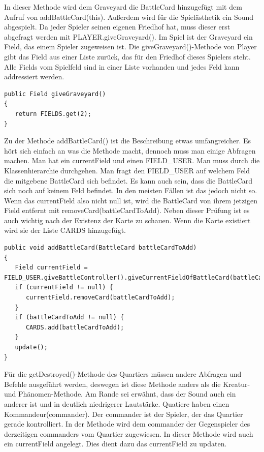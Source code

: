 In dieser Methode wird dem Graveyard die BattleCard hinzugefügt mit dem Aufruf von addBattleCard(this). Außerdem wird für die Spielästhetik ein Sound abgespielt.
Da jeder Spieler seinen eigenen Friedhof hat, muss dieser erst abgefragt werden mit PLAYER.giveGraveyard(). Im Spiel ist der Graveyard ein Field, das einem Spieler zugeweisen ist. Die giveGraveyard()-Methode von Player gibt das Field aus einer Liste zurück, das für den Friedhof dieses Spielers steht. Alle Fields vom Spielfeld sind in einer Liste vorhanden und jedes Feld kann addressiert werden.
\begin{lstlisting}
public Field giveGraveyard()
{
   return FIELDS.get(2);
}
\end{lstlisting}
Zu der Methode addBattleCard() ist die Beschreibung etwas umfangreicher. Es hört sich einfach an was die Methode macht, dennoch muss man einige Abfragen machen.
Man hat ein currentField und einen FIELD\_USER. Man muss durch die Klassenhierarchie durchgehen. Man fragt den FIELD\_USER auf welchem Feld die mitgebene BattleCard sich befindet. Es kann auch sein, dass die BattleCard sich noch auf keinem Feld befindet. In den meisten Fällen ist das jedoch nicht so. Wenn das currentField also nicht null ist, wird die BattleCard von ihrem jetzigen Field entfernt mit removeCard(battleCardToAdd). Neben dieser Prüfung ist es auch wichtig nach der Existenz der Karte zu schauen. Wenn die Karte existiert wird sie der Liste CARDS hinzugefügt.

\begin{lstlisting}[basicstyle=\tiny]
public void addBattleCard(BattleCard battleCardToAdd)
{
   Field currentField = FIELD_USER.giveBattleController().giveCurrentFieldOfBattleCard(battleCardToAdd);
   if (currentField != null) {
      currentField.removeCard(battleCardToAdd);
   }
   if (battleCardToAdd != null) {
      CARDS.add(battleCardToAdd);
   }
   update();
}
\end{lstlisting}
Für die getDestroyed()-Methode des Quartiers müssen andere Abfragen und Befehle ausgeführt werden, deswegen ist diese Methode anders als die Kreatur- und Phänomen-Methode. Am Rande sei erwähnt, dass der Sound auch ein anderer ist und in deutlich niedrigerer Lautstärke.
Quatiere haben einen Kommandeur(commander). Der commander ist der Spieler, der das Quartier gerade kontrolliert. In der Methode wird dem commander der Gegenspieler des derzeitigen commanders vom Quartier zugewiesen. In dieser Methode wird auch ein currentField angelegt.
Dies dient dazu das currentField zu updaten.

